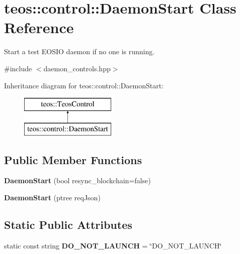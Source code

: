 \hypertarget{classteos_1_1control_1_1_daemon_start}{}\section{teos\+:\+:control\+:\+:Daemon\+Start Class Reference}
\label{classteos_1_1control_1_1_daemon_start}


Start a test E\+O\+S\+IO daemon if no one is running.  




{\ttfamily \#include $<$daemon\+\_\+controls.\+hpp$>$}

Inheritance diagram for teos\+:\+:control\+:\+:Daemon\+Start\+:\begin{figure}[H]
\begin{center}
\leavevmode
\includegraphics[height=2.000000cm]{classteos_1_1control_1_1_daemon_start}
\end{center}
\end{figure}
\subsection*{Public Member Functions}
\begin{DoxyCompactItemize}
\item 
\mbox{\label{classteos_1_1control_1_1_daemon_start_a5a17511cf7eabb346b645f3c34ebfb63}} 
{\bfseries Daemon\+Start} (bool resync\+\_\+blockchain=false)
\item 
\mbox{\label{classteos_1_1control_1_1_daemon_start_ae6f2b43eaab462ec4683c9f56ec35019}} 
{\bfseries Daemon\+Start} (ptree req\+Json)
\end{DoxyCompactItemize}
\subsection*{Static Public Attributes}
\begin{DoxyCompactItemize}
\item 
\mbox{\label{classteos_1_1control_1_1_daemon_start_ad63b0523ef8e608be7d6c22694763f00}} 
static const string {\bfseries D\+O\+\_\+\+N\+O\+T\+\_\+\+L\+A\+U\+N\+CH} = \char`\"{}D\+O\+\_\+\+N\+O\+T\+\_\+\+L\+A\+U\+N\+CH\char`\"{}
\end{DoxyCompactItemize}

